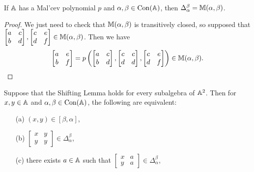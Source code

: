 \begin{appendices}
\begin{prop} If $\mathbb{A}$ has a Mal'cev polynomial $p$ and $\alpha,\beta \in \operatorname{Con}(\mathbb{A})$, then $\Delta_\alpha^\beta = \mathbb{M}(\alpha,\beta)$.
\end{prop}
\begin{proof} We just need to check that $\mathbb{M}(\alpha,\beta)$ is transitively closed, so supposed that $\begin{bmatrix} a & c\\ b & d\end{bmatrix}, \begin{bmatrix} c & e\\ d & f\end{bmatrix} \in \mathbb{M}(\alpha,\beta)$. Then we have
\[
\begin{bmatrix} a & e\\ b & f\end{bmatrix} = p\left(\begin{bmatrix} a & c\\ b & d\end{bmatrix}, \begin{bmatrix} c & c\\ d & d\end{bmatrix}, \begin{bmatrix} c & e\\ d & f\end{bmatrix}\right) \in \mathbb{M}(\alpha,\beta).\qedhere
\]
\end{proof}

\begin{thm}\label{shifting-commutator} Suppose that the Shifting Lemma holds for every subalgebra of $\mathbb{A}^2$. Then for $x,y \in \mathbb{A}$ and $\alpha,\beta \in \operatorname{Con}(\mathbb{A})$, the following are equivalent:
\begin{itemize}
\item[(a)] $(x,y) \in [\beta,\alpha]$,

\item[(b)] $\begin{bmatrix} x & y\\ y & y\end{bmatrix} \in \Delta_\alpha^\beta$,

\item[(c)] there exists $a \in \mathbb{A}$ such that $\begin{bmatrix} x & a\\ y & a\end{bmatrix} \in \Delta_\alpha^\beta$,


\end{itemize}
\end{thm}
\end{appendices}
